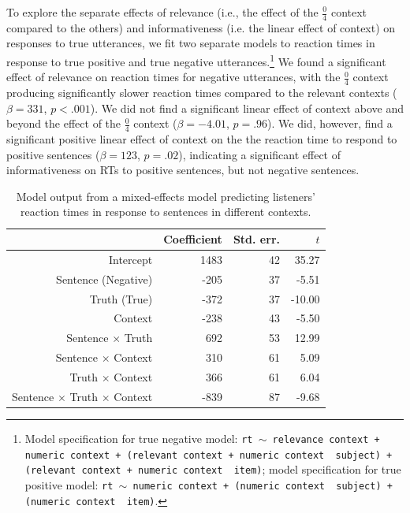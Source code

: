 \documentclass[man, floatsintext, noapacite]{apa6}
\begin{document}
To explore the separate effects of relevance (i.e., the effect of the $\frac{0}{4}$ context compared to the others) and informativeness (i.e. the linear effect of context) on responses to true utterances, we fit two separate models to reaction times in response to true positive and true negative utterances.\footnote{Model specification for true negative model: \texttt{rt $\sim$  relevance context + numeric context + (relevant context + numeric context~\textbar~subject) +  (relevant context + numeric context~\textbar~item)}; model specification for true positive model: \texttt{rt $\sim$  numeric context + (numeric context~\textbar~subject) +  (numeric context~\textbar~item)}.} We found a significant effect of relevance on reaction times for negative utterances, with the $\frac{0}{4}$ context producing significantly slower reaction times compared to the relevant contexts ($\beta= 331$, $p< .001$). We did not find a significant linear effect of context above and beyond the effect of the  $\frac{0}{4}$ context ($\beta= -4.01$, $p = .96$). We did, however, find a significant positive linear effect of context on the the reaction time to respond to positive sentences ($\beta= 123$, $p = .02$), indicating a significant effect of informativeness on RTs to positive sentences, but not negative sentences. 

\begin{table}
\caption{\label{tab: exp1_listenermodel} Model output from a mixed-effects model predicting listeners' reaction times in response to sentences in different contexts.}
\begin{center}
\begin{tabular}{rrrr}
  \hline
 & Coefficient & Std. err. & $t$ \\ 
  \hline
Intercept & 1483 & 42 & 35.27 \\ 
  Sentence (Negative) & -205 & 37 & -5.51  \\ 
  Truth (True) & -372 & 37 & -10.00 \\
  Context & -238 & 43 & -5.50 \\ 
  Sentence $\times$ Truth & 692 & 53 & 12.99 \\
  Sentence $\times$ Context & 310 & 61 & 5.09 \\
  Truth $\times$ Context & 366 & 61 & 6.04 \\
  Sentence $\times$ Truth $\times$ Context & -839 & 87 & -9.68 \\
   \hline
\end{tabular}
\end{center}
\end{table}
\end{document}
